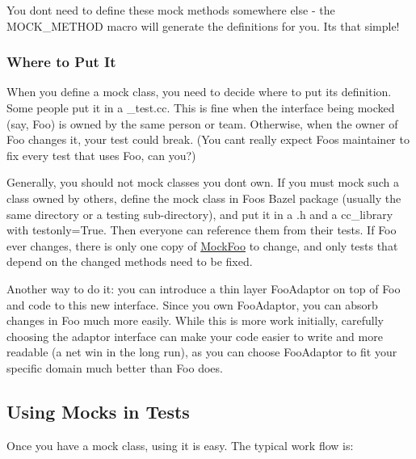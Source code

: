 You don\textquotesingle{}t need to define these mock methods somewhere else -\/ the {\ttfamily M\+O\+C\+K\+\_\+\+M\+E\+T\+H\+OD} macro will generate the definitions for you. It\textquotesingle{}s that simple!

\subsubsection*{Where to Put It}

When you define a mock class, you need to decide where to put its definition. Some people put it in a {\ttfamily \+\_\+test.\+cc}. This is fine when the interface being mocked (say, {\ttfamily Foo}) is owned by the same person or team. Otherwise, when the owner of {\ttfamily Foo} changes it, your test could break. (You can\textquotesingle{}t really expect {\ttfamily Foo}\textquotesingle{}s maintainer to fix every test that uses {\ttfamily Foo}, can you?)

Generally, you should not mock classes you don\textquotesingle{}t own. If you must mock such a class owned by others, define the mock class in {\ttfamily Foo}\textquotesingle{}s Bazel package (usually the same directory or a {\ttfamily testing} sub-\/directory), and put it in a {\ttfamily .h} and a {\ttfamily cc\+\_\+library} with {\ttfamily testonly=True}. Then everyone can reference them from their tests. If {\ttfamily Foo} ever changes, there is only one copy of {\ttfamily \mbox{\hyperlink{classMockFoo}{Mock\+Foo}}} to change, and only tests that depend on the changed methods need to be fixed.

Another way to do it\+: you can introduce a thin layer {\ttfamily Foo\+Adaptor} on top of {\ttfamily Foo} and code to this new interface. Since you own {\ttfamily Foo\+Adaptor}, you can absorb changes in {\ttfamily Foo} much more easily. While this is more work initially, carefully choosing the adaptor interface can make your code easier to write and more readable (a net win in the long run), as you can choose {\ttfamily Foo\+Adaptor} to fit your specific domain much better than {\ttfamily Foo} does.

\subsection*{Using Mocks in Tests}

Once you have a mock class, using it is easy. The typical work flow is\+:


